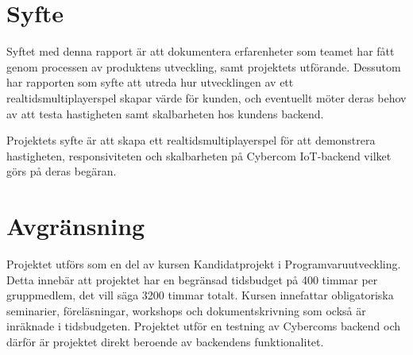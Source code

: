 \section{Syfte}
\label{sec:aim}
Syftet med denna rapport är att dokumentera erfarenheter som teamet har fått genom processen av produktens utveckling, samt projektets utförande. Dessutom har rapporten som syfte att utreda hur utvecklingen av ett realtidsmultiplayerspel skapar värde för kunden, och eventuellt möter deras behov av att testa hastigheten samt skalbarheten hos kundens backend.


Projektets syfte är att skapa ett realtidsmultiplayerspel för att demonstrera hastigheten, responsiviteten och skalbarheten på Cybercom IoT-backend vilket görs på deras begäran.
\section{Avgränsning}
\label{sec:delimitations}

Projektet utförs som en del av kursen Kandidatprojekt i Programvaruutveckling. Detta innebär att projektet har en begränsad tidsbudget på 400 timmar per gruppmedlem, det vill säga 3200 timmar totalt. Kursen innefattar obligatoriska seminarier, föreläsningar, workshops och dokumentskrivning som också är inräknade i tidsbudgeten. Projektet utför en testning av Cybercoms backend och därför är projektet direkt beroende av backendens funktionalitet.
